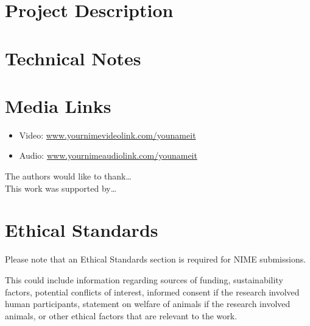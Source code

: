 \documentclass{nimemusic}
\begin{document}
\section{Project Description}

\lipsum[2]

\section{Technical Notes}

\lipsum[3]

\section{Media Links}

\begin{itemize}
	\item Video: \url{www.yournimevideolink.com/younameit}
	\item Audio: \url{www.yournimeaudiolink.com/younameit}
\end{itemize}


\begin{acks}
The authors would like to thank\ldots
\\
This work was supported by\ldots
\end{acks}

\section*{Ethical Standards}

Please note that an Ethical Standards section is required for NIME submissions.

This could include information regarding sources of funding, sustainability factors, potential conflicts of interest,  informed consent if the research involved human participants, statement on welfare of animals if the research involved animals, or other ethical factors that are relevant to the work.



\end{document}
